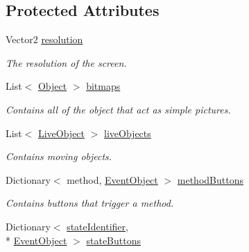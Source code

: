 \subsection*{Protected Attributes}
\begin{DoxyCompactItemize}
\item 
\hypertarget{classwp__engine_1_1_state_a73bf7aa957cff5e5e91b7015daa2894f}{Vector2 \hyperlink{classwp__engine_1_1_state_a73bf7aa957cff5e5e91b7015daa2894f}{resolution}}\label{classwp__engine_1_1_state_a73bf7aa957cff5e5e91b7015daa2894f}

\begin{DoxyCompactList}\small\item\em The resolution of the screen. \end{DoxyCompactList}\item 
\hypertarget{classwp__engine_1_1_state_a53ed789963fc0d6863ecbbe34a902d5e}{List$<$ \hyperlink{classwp__engine_1_1_object}{Object} $>$ \hyperlink{classwp__engine_1_1_state_a53ed789963fc0d6863ecbbe34a902d5e}{bitmaps}}\label{classwp__engine_1_1_state_a53ed789963fc0d6863ecbbe34a902d5e}

\begin{DoxyCompactList}\small\item\em Contains all of the object that act as simple pictures. \end{DoxyCompactList}\item 
\hypertarget{classwp__engine_1_1_state_abcdac647febd7fa9d599e679c3367848}{List$<$ \hyperlink{classwp__engine_1_1_live_object}{Live\-Object} $>$ \hyperlink{classwp__engine_1_1_state_abcdac647febd7fa9d599e679c3367848}{live\-Objects}}\label{classwp__engine_1_1_state_abcdac647febd7fa9d599e679c3367848}

\begin{DoxyCompactList}\small\item\em Contains moving objects. \end{DoxyCompactList}\item 
\hypertarget{classwp__engine_1_1_state_a19e966030739c40f4c8f6e3a1476f02e}{Dictionary$<$ method, \hyperlink{classwp__engine_1_1_event_object}{Event\-Object} $>$ \hyperlink{classwp__engine_1_1_state_a19e966030739c40f4c8f6e3a1476f02e}{method\-Buttons}}\label{classwp__engine_1_1_state_a19e966030739c40f4c8f6e3a1476f02e}

\begin{DoxyCompactList}\small\item\em Contains buttons that trigger a method. \end{DoxyCompactList}\item 
\hypertarget{classwp__engine_1_1_state_a4c5480cd2be3f954d88417d24aee6029}{Dictionary$<$ \hyperlink{namespacewp__engine_aae123481cdcc6dc4c4474c1b0b62b152}{state\-Identifier}, \\*
\hyperlink{classwp__engine_1_1_event_object}{Event\-Object} $>$ \hyperlink{classwp__engine_1_1_state_a4c5480cd2be3f954d88417d24aee6029}{state\-Buttons}}\label{classwp__engine_1_1_state_a4c5480cd2be3f954d88417d24aee6029}


\end{DoxyCompactItemize}
